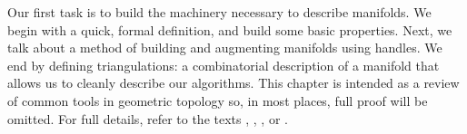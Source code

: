 Our first task is to build the machinery necessary to describe manifolds.
We begin with a quick, formal definition, and build some basic properties.
Next, we talk about a method of building and augmenting manifolds using handles.
We end by defining triangulations: a combinatorial description of a manifold that allows us to cleanly describe our algorithms.
This chapter is intended as a review of common tools in geometric topology so, in most places, full proof will be omitted.
For full details, refer to the texts \cite{GompStip}, \cite{Hirsch67}, \cite{Kosi93}, or \cite{Lee00}.